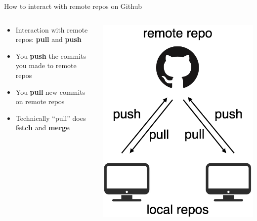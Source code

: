 \documentclass[handout,pdftex,10pt,aspectratio=169]{beamer}
\begin{document}
\begin{frame}{How to interact with remote repos on Github}
  \begin{columns}[c]
    \begin{column}{0.6\linewidth}
      \begin{itemize}\setlength\itemsep{10pt}
        \item<1-> Interaction with remote repos: \textbf{pull} and \textbf{push}
        \item<2-> You \textbf{push} the commits you made to remote repos
        \item<3-> You \textbf{pull} new commits on remote repos 
        \item<3-> Technically ``pull'' does \textbf{fetch} and \textbf{merge}
      \end{itemize}
    \end{column} \hfill
    \begin{column}{0.39\linewidth}
      \includegraphics[width = 0.9\linewidth]{github_pullpush.png}
    \end{column}
  \end{columns}
\end{frame}
\end{document}
